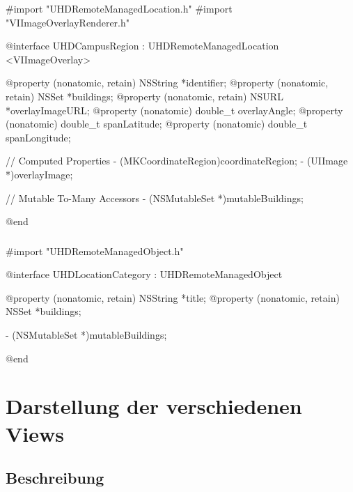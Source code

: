 \documentclass{report}
\begin{document}
\begin{objclst}
#import "UHDRemoteManagedLocation.h"
#import "VIImageOverlayRenderer.h"

@interface UHDCampusRegion : UHDRemoteManagedLocation <VIImageOverlay>

@property (nonatomic, retain) NSString *identifier;
@property (nonatomic, retain) NSSet *buildings;
@property (nonatomic, retain) NSURL *overlayImageURL;
@property (nonatomic) double_t overlayAngle;
@property (nonatomic) double_t spanLatitude;
@property (nonatomic) double_t spanLongitude;

// Computed Properties
- (MKCoordinateRegion)coordinateRegion;
- (UIImage *)overlayImage;

// Mutable To-Many Accessors
- (NSMutableSet *)mutableBuildings;

@end
\end{objclst}

\vspace{0,5cm}

\subsubsection{}

\begin{objclst}
#import "UHDRemoteManagedObject.h"

@interface UHDLocationCategory : UHDRemoteManagedObject 

@property (nonatomic, retain) NSString *title;
@property (nonatomic, retain) NSSet *buildings;

- (NSMutableSet *)mutableBuildings;

@end
\end{objclst}

\newpage

\section{Darstellung der verschiedenen Views}

\subsection{Beschreibung}
\end{document}
